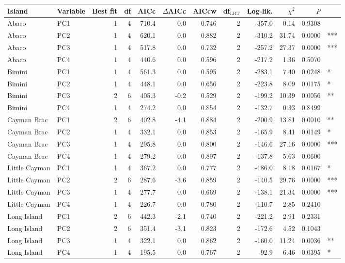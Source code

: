 
\begin{tabular}{llrrrrrrrrrl}
\toprule
Island & Variable & Best fit & df & AICc & $\Delta$AICc & AICcw & df$_{\mbox{LRT}}$ & Log-lik. & $\chi^2$ & $P$ & \\
\midrule
Abaco & PC1 & 1 & 4 & 710.4 & 0.0 & 0.746 & 2 & -357.0 & 0.14 & 0.9308 & \\
Abaco & PC2 & 1 & 4 & 620.1 & 0.0 & 0.882 & 2 & -310.2 & 31.74 & 0.0000 & ***\\
Abaco & PC3 & 1 & 4 & 517.8 & 0.0 & 0.732 & 2 & -257.2 & 27.37 & 0.0000 & ***\\
Abaco & PC4 & 1 & 4 & 440.6 & 0.0 & 0.596 & 2 & -217.2 & 1.36 & 0.5070 & \\
Bimini & PC1 & 1 & 4 & 561.3 & 0.0 & 0.595 & 2 & -283.1 & 7.40 & 0.0248 & *\\
Bimini & PC2 & 1 & 4 & 448.1 & 0.0 & 0.656 & 2 & -223.8 & 8.09 & 0.0175 & *\\
Bimini & PC3 & 2 & 6 & 405.3 & -0.2 & 0.529 & 2 & -199.2 & 10.39 & 0.0056 & **\\
Bimini & PC4 & 1 & 4 & 274.2 & 0.0 & 0.854 & 2 & -132.7 & 0.33 & 0.8499 & \\
Cayman Brac & PC1 & 2 & 6 & 402.8 & -4.1 & 0.884 & 2 & -200.9 & 13.81 & 0.0010 & **\\
Cayman Brac & PC2 & 1 & 4 & 332.1 & 0.0 & 0.853 & 2 & -165.9 & 8.41 & 0.0149 & *\\
Cayman Brac & PC3 & 1 & 4 & 295.8 & 0.0 & 0.800 & 2 & -146.6 & 27.16 & 0.0000 & ***\\
Cayman Brac & PC4 & 1 & 4 & 279.2 & 0.0 & 0.897 & 2 & -137.8 & 5.63 & 0.0600 & \\
Little Cayman & PC1 & 1 & 4 & 367.2 & 0.0 & 0.777 & 2 & -186.0 & 8.18 & 0.0167 & *\\
Little Cayman & PC2 & 2 & 6 & 287.6 & -3.6 & 0.859 & 2 & -140.5 & 29.76 & 0.0000 & ***\\
Little Cayman & PC3 & 1 & 4 & 277.7 & 0.0 & 0.669 & 2 & -138.1 & 21.34 & 0.0000 & ***\\
Little Cayman & PC4 & 1 & 4 & 226.7 & 0.0 & 0.780 & 2 & -110.7 & 2.85 & 0.2410 & \\
Long Island & PC1 & 2 & 6 & 442.3 & -2.1 & 0.740 & 2 & -221.2 & 2.91 & 0.2331 & \\
Long Island & PC2 & 2 & 6 & 351.4 & -3.1 & 0.823 & 2 & -172.6 & 4.52 & 0.1043 & \\
Long Island & PC3 & 1 & 4 & 322.1 & 0.0 & 0.862 & 2 & -160.0 & 11.24 & 0.0036 & **\\
Long Island & PC4 & 1 & 4 & 195.5 & 0.0 & 0.767 & 2 & -92.9 & 6.46 & 0.0395 & *\\
\bottomrule
\end{tabular}
